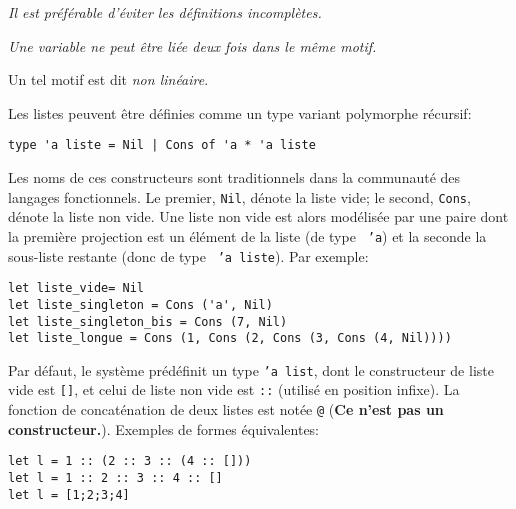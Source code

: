 




\emph{Il est préférable d'éviter les définitions incomplètes.}


\emph{Une variable ne peut être liée deux fois dans le même motif.}

\bigskip




\bigskip

Un tel motif est dit \emph{non linéaire}.


Les listes peuvent être définies comme un type variant polymorphe
récursif:
{\small
\begin{verbatim}
type 'a liste = Nil | Cons of 'a * 'a liste
\end{verbatim}
}
Les noms de ces constructeurs sont traditionnels dans la communauté
des langages fonctionnels. Le premier, \texttt{\small Nil}, dénote la
liste vide; le second, \texttt{\small Cons}, dénote la liste non
vide. Une liste non vide est alors modélisée par une paire dont la
première projection est un élément de la liste (de type \texttt{\small
'a}) et la seconde la sous-liste restante (donc de type \texttt{\small
'a liste}). Par exemple:
{\small
\begin{verbatim}
let liste_vide= Nil
let liste_singleton = Cons ('a', Nil)
let liste_singleton_bis = Cons (7, Nil)
let liste_longue = Cons (1, Cons (2, Cons (3, Cons (4, Nil))))
\end{verbatim}
}

Par défaut, le système prédéfinit un type \texttt{\small 'a list},
dont le constructeur de liste vide est \verb+[]+, et celui de liste
non vide est \verb+::+ (utilisé en position infixe). La fonction de
concaténation de deux listes est notée \verb+@+ (\textbf{Ce n'est pas
un constructeur.}). Exemples de formes équivalentes:
{\small
\begin{verbatim}
let l = 1 :: (2 :: 3 :: (4 :: []))
let l = 1 :: 2 :: 3 :: 4 :: []
let l = [1;2;3;4]
\end{verbatim}
}


